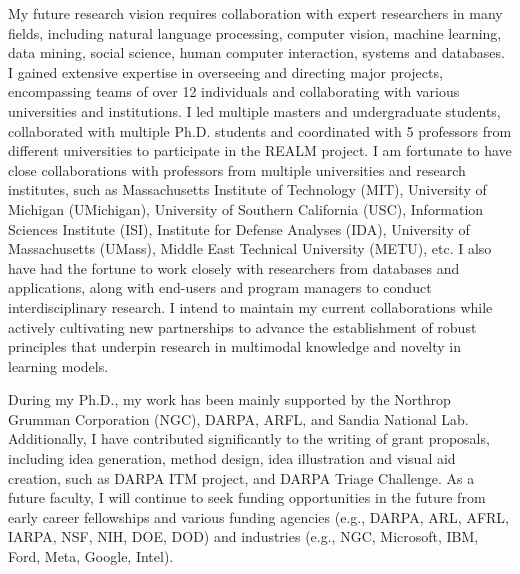 My future research vision requires collaboration with expert researchers in many
fields, including natural language processing, computer vision, machine learning, data mining, social science, human computer interaction, systems and databases. 
I gained extensive expertise in overseeing and directing major projects, encompassing teams of over 12 individuals and collaborating with various universities and institutions.
I led multiple masters and undergraduate students, collaborated with multiple Ph.D. students and coordinated with 5 professors from different universities to participate in the REALM project. I am fortunate to have close collaborations with professors from multiple universities and research institutes, such as Massachusetts Institute of Technology (MIT), University of Michigan (UMichigan), University of Southern California (USC), Information Sciences Institute (ISI), Institute for Defense Analyses (IDA), University of Massachusetts (UMass), Middle East Technical University (METU), etc. I also have had the fortune to work closely with researchers from databases and applications, along with end-users and program managers to conduct interdisciplinary research. 
I intend to maintain my current collaborations while actively cultivating new partnerships to advance the establishment of robust principles that underpin research in multimodal knowledge and novelty in learning models.

During my Ph.D., my work has been mainly supported by the Northrop Grumman Corporation (NGC), 
DARPA, ARFL, and Sandia National Lab. 
Additionally, I have contributed significantly to the writing of grant proposals, including idea
generation, method design, idea illustration and visual aid creation, such as 
DARPA ITM project, and DARPA Triage Challenge.
As a future faculty, I will continue to seek funding opportunities in the future from early career fellowships and various funding agencies (e.g., DARPA, ARL, AFRL, IARPA, NSF, NIH, DOE, DOD) and industries (e.g., NGC, Microsoft, IBM, Ford, Meta, Google, Intel).








